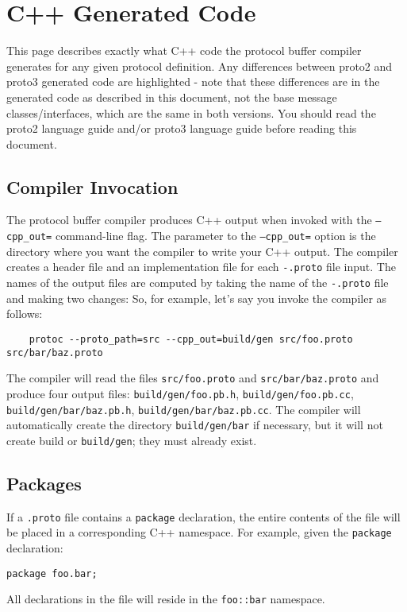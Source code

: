
\chapter{C++ Generated Code}\label{ch:c++-generated-code}
This page describes exactly what C++ code the protocol buffer compiler generates for any given protocol definition. Any differences between proto2 and proto3 generated code are highlighted - note that these differences are in the generated code as described in this document, not the base message classes/interfaces, which are the same in both versions. You should read the proto2 language guide and/or proto3 language guide before reading this document.

\section{Compiler Invocation}\label{sec:compiler-invocation}
The protocol buffer compiler produces C++ output when invoked with the \texttt{--cpp_out=} command-line flag. The parameter to the \texttt{--cpp_out=} option is the directory where you want the compiler to write your C++ output. The compiler creates a header file and an implementation file for each \texttt{-.proto} file input. The names of the output files are computed by taking the name of the \texttt{-.proto} file and making two changes:
So, for example, let's say you invoke the compiler as follows:
\begin{verbatim}
    protoc --proto_path=src --cpp_out=build/gen src/foo.proto src/bar/baz.proto
\end{verbatim}

The compiler will read the files \texttt{src/foo.proto} and \texttt{src/bar/baz.proto} and produce four output files: \texttt{build/gen/foo.pb.h}, \texttt{build/gen/foo.pb.cc}, \texttt{build/gen/bar/baz.pb.h}, \texttt{build/gen/bar/baz.pb.cc}. The compiler will automatically create the directory \texttt{build/gen/bar} if necessary, but it will not create build or \texttt{build/gen}; they must already exist.

\section{Packages}\label{sec:packages}
If a \texttt{.proto} file contains a \texttt{package} declaration, the entire contents of the file will be placed in a corresponding C++ namespace. For example, given the \texttt{package} declaration:
\begin{verbatim}
package foo.bar;
\end{verbatim}
All declarations in the file will reside in the \texttt{foo::bar} namespace.

